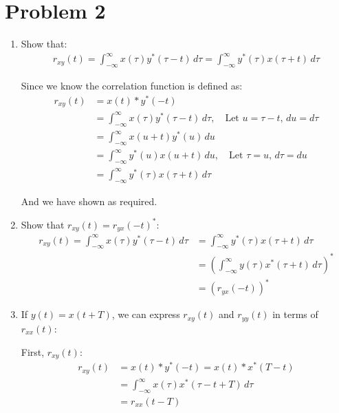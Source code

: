 \documentclass{article}
\begin{document}
\section{Problem 2}
\begin{enumerate}[label=2.\arabic*]
    \item Show that:
    \begin{align*}
        r_{xy}(t) = \int_{-\infty}^{\infty} x(\tau)y^*(\tau - t) \, d\tau = \int_{-\infty}^{\infty} y^*(\tau)x(\tau + t) \, d\tau
    \end{align*}

    Since we know the correlation function is defined as:
    \begin{align*}
        r_{xy}(t) &= x(t) \ast y^*(-t) \\
        &= \int_{-\infty}^{\infty} x(\tau)y^*(\tau - t) \, d\tau, \quad \text{Let } u = \tau - t, \, du = d\tau \\ 
        &= \int_{-\infty}^{\infty} x(u + t)y^*(u) \, du \\
        &= \int_{-\infty}^{\infty} y^*(u)x(u + t) \, du, \quad \text{Let } \tau = u, \, d\tau = du \\
        &= \int_{-\infty}^{\infty} y^*(\tau)x(\tau + t) \, d\tau
    \end{align*}

    And we have shown as required.

    \item Show that $r_{xy}(t) = r_{yx}(-t)^\ast$:
    \begin{align*}
        r_{xy}(t) = \int_{-\infty}^{\infty} x(\tau)y^*(\tau - t) \, d\tau &= \int_{-\infty}^{\infty} y^*(\tau)x(\tau + t) \, d\tau \\
        &= \left(\int_{-\infty}^{\infty} y(\tau)x^*(\tau + t) \, d\tau\right)^\ast \\
        &= \left(r_{yx}(-t)\right)^\ast
    \end{align*}

    \item If $y(t) = x(t+T)$, we can express $r_{xy}(t)$ and $r_{yy}(t)$ in terms of $r_{xx}(t)$:
    
    First, $r_{xy}(t)$:
    \begin{align*}
        r_{xy}(t) &= x(t) \ast y^*(-t) = x(t) \ast x^*(T - t) \\
        &= \int_{-\infty}^{\infty} x(\tau)x^*(\tau - t + T) \, d\tau \\
        &= r_{xx}(t - T)
    \end{align*}


\end{enumerate}
\end{document}
